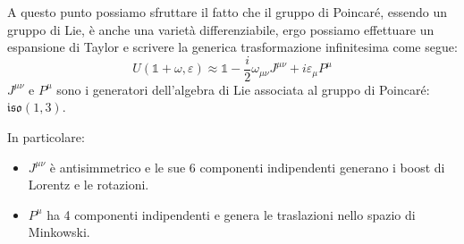 \documentclass[../main.tex]{subfiles}
\begin{document}
A questo punto possiamo sfruttare il fatto che il gruppo di Poincaré, essendo un gruppo di Lie, è anche una varietà differenziabile, ergo possiamo effettuare un espansione di Taylor e scrivere la generica trasformazione infinitesima come segue:
\begin{equation}
    \boxed{
    U(\mathbb 1 + \omega, \varepsilon) \approx \mathbb 1 - \frac{i}{2}\omega_{\mu\nu}J^{\mu\nu} + i\varepsilon_\mu P^\mu
    }
    \label{eq:infinit_poinc_transf_taylor}
\end{equation}
\(J^{\mu\nu}\) e \(P^\mu\) sono i generatori dell'algebra di Lie associata al gruppo di Poincaré: \(\mathfrak{iso}(1,3)\).

In particolare:
\begin{itemize}
    \item \(J^{\mu\nu}\) è antisimmetrico e le sue 6 componenti indipendenti generano i boost di Lorentz e le rotazioni.
    \item \(P^\mu\) ha 4 componenti indipendenti e genera le traslazioni nello spazio di Minkowski.
\end{itemize}
\end{document}
